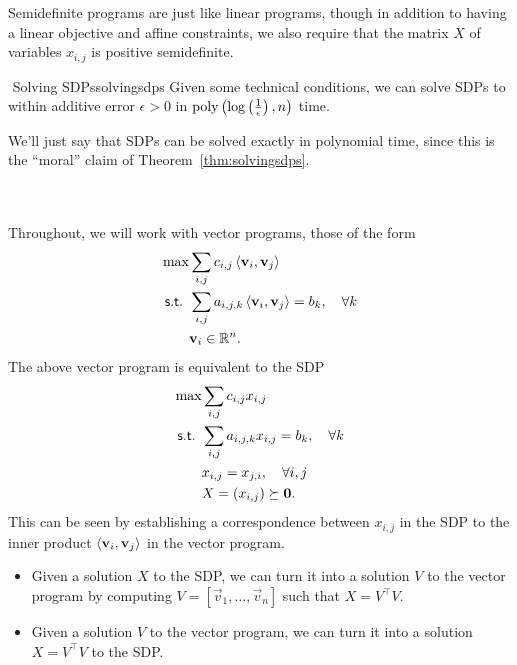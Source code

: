         \begin{remark*}
            Semidefinite programs are just like linear programs, though in addition to having a linear objective and affine constraints, we also require that the matrix \(X\) of variables \(x_{i,j}\) is positive semidefinite.
        \end{remark*}
        \begin{theorem}{\Stop\,\,Solving SDPs}{solvingsdps}
            Given some technical conditions, we can solve SDPs to within additive error \(\epsilon>0\) in \(\operatorname{poly}\left(\log\left(\frac{1}{\epsilon}\right),n\right)\) time.
        \end{theorem}
        \begin{remark*}
            We'll just say that SDPs can be solved exactly in polynomial time, since this is the ``moral'' claim of Theorem~\ref{thm:solvingsdps}.
        \end{remark*}
        \vphantom
        \\
        \\
        Throughout, we will work with vector programs, those of the form
        \begin{align*}
            \max&\sum_{i,j}c_{i,j}\left\langle \mathbf{v}_i,\mathbf{v}_j\right\rangle \\
            \textsf{s.t. }&\sum_{i,j}a_{i,j,k}\left\langle \mathbf{v}_i,\mathbf{v}_j\right\rangle=b_k,\quad \forall k \\
            &\mathbf{v}_i\in\mathbb{R}^n.
        \end{align*}
        The above vector program is equivalent to the SDP
        \begin{align*}
            \max&\sum_{i,j}c_{i,j}x_{i,j} \\
            \textsf{s.t. }&\sum_{i,j}a_{i,j,k}x_{i,j}=b_k,\quad \forall k \\
            &x_{i,j}=x_{j,i},\quad \forall i,j \\
            &X=(x_{i,j})\succeq\mathbf{0}.
        \end{align*}
        This can be seen by establishing a correspondence between \(x_{i,j}\) in the SDP to the inner product \(\left\langle \mathbf{v}_i,\mathbf{v}_j\right\rangle\) in the vector program.
        \begin{itemize}
            \item Given a solution \(X\) to the SDP, we can turn it into a solution \(V\) to the vector program by computing \(V=[\vec{v}_1,\ldots,\vec{v}_n]\) such that \(X=V^\top V\).
            \item Given a solution \(V\) to the vector program, we can turn it into a solution \(X=V^\top V\) to the SDP.
        \end{itemize}
